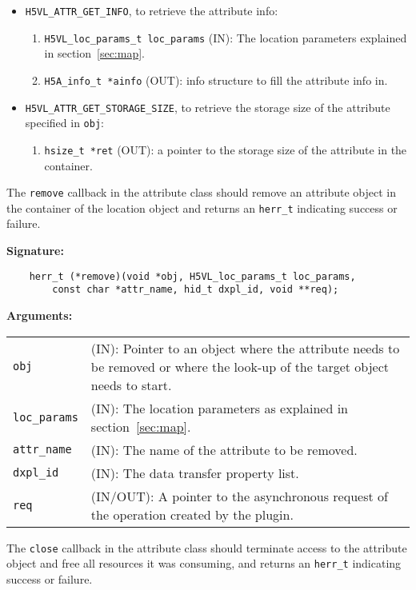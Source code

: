 \begin{itemize}
\item {\tt H5VL\_ATTR\_GET\_INFO}, to retrieve the attribute info:
  \begin{enumerate}
  \item {\tt H5VL\_loc\_params\_t loc\_params} (IN): The location parameters
    explained in section~\ref{sec:map}. 
  \item {\tt H5A\_info\_t *ainfo} (OUT): info structure to fill the
    attribute info in.
  \end{enumerate}

\item {\tt H5VL\_ATTR\_GET\_STORAGE\_SIZE}, to retrieve the storage
  size of the attribute specified in {\tt obj}:
  \begin{enumerate}
  \item {\tt hsize\_t *ret} (OUT): a pointer to the storage size of
    the attribute in the container.
  \end{enumerate}

\end{itemize}

The {\tt remove} callback in the attribute class should remove an
attribute object in the container of the location object and returns
an {\tt herr\_t} indicating success or failure.

\textbf{Signature:}
\begin{lstlisting}
    herr_t (*remove)(void *obj, H5VL_loc_params_t loc_params, 
        const char *attr_name, hid_t dxpl_id, void **req);
\end{lstlisting}

\textbf{Arguments:}\\
\begin{tabular}{l p{10cm}}
  {\tt obj} & (IN): Pointer to an object where the attribute needs
  to be removed or where the look-up of the target object needs to
  start.\\
  {\tt loc\_params} & (IN): The location parameters as explained in
  section~\ref{sec:map}.\\
  {\tt attr\_name} & (IN): The name of the attribute to be removed.\\
  {\tt dxpl\_id} & (IN): The data transfer property list.\\
  {\tt req} & (IN/OUT): A pointer to the asynchronous request of the
  operation created by the plugin.\\
\end{tabular}

The {\tt close} callback in the attribute class should terminate
access to the attribute object and free all resources it was
consuming, and returns an {\tt herr\_t} indicating success or failure.

